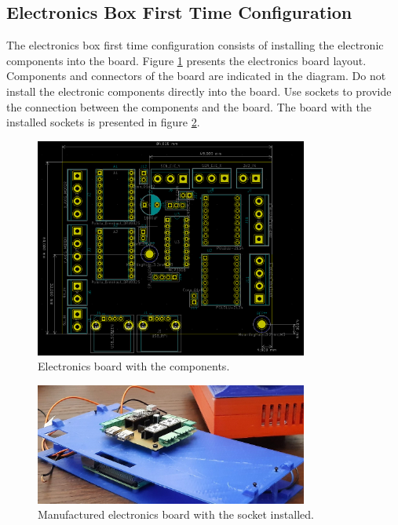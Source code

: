 \documentclass{article}
\begin{document}
\subsection{Electronics Box First Time Configuration}
The electronics box first time configuration consists of installing the electronic components into the board. Figure \ref{fig:electronics_board} presents the electronics board layout. Components and connectors of the board are indicated in the diagram. Do not install the electronic components directly into the board. Use sockets to provide the connection between the components and the board. The board with the installed sockets is presented in figure \ref{fig:electronics_socket}.

\begin{figure}[H]
    \centering
    \includegraphics[width=0.8\textwidth]{images/first_time/board.png}
    \caption{Electronics board with the components.}
    \label{fig:electronics_board}
\end{figure}

\begin{figure}[H]
    \centering
    \includegraphics[width=0.8\textwidth]{images/first_time/PCB_mkII.jpg}
    \caption{Manufactured electronics board with the socket installed.}
    \label{fig:electronics_socket}
\end{figure}
\end{document}
